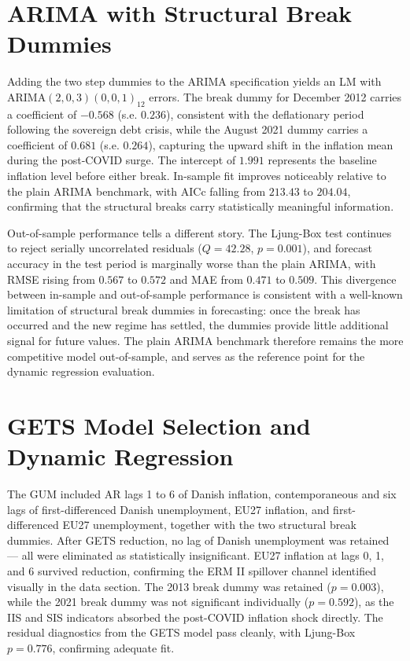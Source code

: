 \section{ARIMA with Structural Break Dummies}

Adding the two step dummies to the ARIMA specification yields an LM with 
ARIMA$(2,0,3)(0,0,1)_{12}$ errors. The break dummy for December 2012 carries 
a coefficient of $-0.568$ (s.e. $0.236$), consistent with the deflationary 
period following the sovereign debt crisis, while the August 2021 dummy 
carries a coefficient of $0.681$ (s.e. $0.264$), capturing the upward shift 
in the inflation mean during the post-COVID surge. The intercept of $1.991$ 
represents the baseline inflation level before either break. In-sample fit 
improves noticeably relative to the plain ARIMA benchmark, with AICc falling 
from $213.43$ to $204.04$, confirming that the structural breaks carry 
statistically meaningful information.

Out-of-sample performance tells a different story. The Ljung-Box test 
continues to reject serially uncorrelated residuals ($Q = 42.28$, $p = 0.001$), 
and forecast accuracy in the test period is marginally worse than the plain 
ARIMA, with RMSE rising from $0.567$ to $0.572$ and MAE from $0.471$ to 
$0.509$. This divergence between in-sample and out-of-sample performance is 
consistent with a well-known limitation of structural break dummies in 
forecasting: once the break has occurred and the new regime has settled, the 
dummies provide little additional signal for future values. The plain ARIMA 
benchmark therefore remains the more competitive model out-of-sample, and 
serves as the reference point for the dynamic regression evaluation.

\section{GETS Model Selection and Dynamic Regression}

The GUM included AR lags 1 to 6 of Danish inflation, contemporaneous and six 
lags of first-differenced Danish unemployment, EU27 inflation, and 
first-differenced EU27 unemployment, together with the two structural break 
dummies. After GETS reduction, no lag of Danish unemployment was retained — 
all were eliminated as statistically insignificant. EU27 inflation at lags 0, 
1, and 6 survived reduction, confirming the ERM II spillover channel identified 
visually in the data section. The 2013 break dummy was retained ($p = 0.003$), 
while the 2021 break dummy was not significant individually ($p = 0.592$), as 
the IIS and SIS indicators absorbed the post-COVID inflation shock directly. 
The residual diagnostics from the GETS model pass cleanly, with Ljung-Box 
$p = 0.776$, confirming adequate fit.

